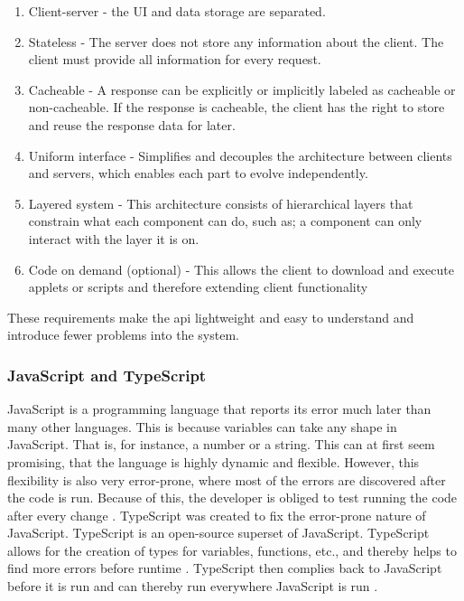\begin{enumerate}
  \item Client-server - the UI and data storage are separated. 
  \item Stateless - The server does not store any information about the client. The client must provide all information for every request. 
  \item Cacheable - A response can be explicitly or implicitly labeled as cacheable or non-cacheable. If the response is cacheable, the client has the right to store and reuse the response data for later. 
  \item Uniform interface - Simplifies and decouples the architecture between clients and servers, which enables each part to evolve independently.  
  \item Layered system - This architecture consists of hierarchical layers that constrain what each component can do, such as; a component can only interact with the layer it is on. 
  \item Code on demand (optional) - This allows the client to download and execute applets or scripts and therefore extending client functionality 
\end{enumerate}

These requirements make the \acrshort{api} lightweight and easy to understand and introduce fewer problems into the system. 


\subsubsection{JavaScript and TypeScript}%
\label{ssub:JavaScript and TypeScript}
JavaScript is a programming language that reports its error much later than many other languages. This is because variables can take any shape in JavaScript. That is, for instance, a number or a string. This can at first seem promising, that the language is highly dynamic and flexible. However, this flexibility is also very error-prone, where most of the errors are discovered after the code is run. Because of this, the developer is obliged to test running the code after every change \cite{taivalsaari2008web}. TypeScript was created to fix the error-prone nature of JavaScript. TypeScript is an open-source superset of JavaScript. TypeScript allows for the creation of types for variables, functions, etc., and thereby helps to find more errors before runtime \cite{WhyYouShould}. TypeScript then complies back to JavaScript before it is run and can thereby run everywhere JavaScript is run \cite{WhyYouShould}. 



